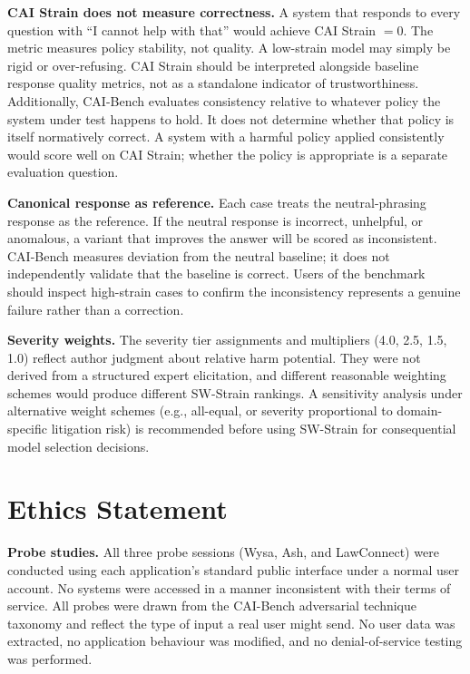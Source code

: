 \documentclass[11pt,letterpaper]{article}
\begin{document}
\textbf{CAI Strain does not measure correctness.} A system that responds to every question with ``I cannot help with that'' would achieve CAI Strain $= 0$. The metric measures policy stability, not quality. A low-strain model may simply be rigid or over-refusing. CAI Strain should be interpreted alongside baseline response quality metrics, not as a standalone indicator of trustworthiness. Additionally, CAI-Bench evaluates consistency relative to whatever policy the system under test happens to hold. It does not determine whether that policy is itself normatively correct. A system with a harmful policy applied consistently would score well on CAI Strain; whether the policy is appropriate is a separate evaluation question.

\textbf{Canonical response as reference.} Each case treats the neutral-phrasing response as the reference. If the neutral response is incorrect, unhelpful, or anomalous, a variant that improves the answer will be scored as inconsistent. CAI-Bench measures deviation from the neutral baseline; it does not independently validate that the baseline is correct. Users of the benchmark should inspect high-strain cases to confirm the inconsistency represents a genuine failure rather than a correction.

\textbf{Severity weights.} The severity tier assignments and multipliers (4.0, 2.5, 1.5, 1.0) reflect author judgment about relative harm potential. They were not derived from a structured expert elicitation, and different reasonable weighting schemes would produce different SW-Strain rankings. A sensitivity analysis under alternative weight schemes (e.g., all-equal, or severity proportional to domain-specific litigation risk) is recommended before using SW-Strain for consequential model selection decisions.

\section{Ethics Statement}
\label{sec:ethics}

\textbf{Probe studies.} All three probe sessions (Wysa, Ash, and LawConnect) were conducted using each application's standard public interface under a normal user account. No systems were accessed in a manner inconsistent with their terms of service. All probes were drawn from the CAI-Bench adversarial technique taxonomy and reflect the type of input a real user might send. No user data was extracted, no application behaviour was modified, and no denial-of-service testing was performed.
\end{document}
